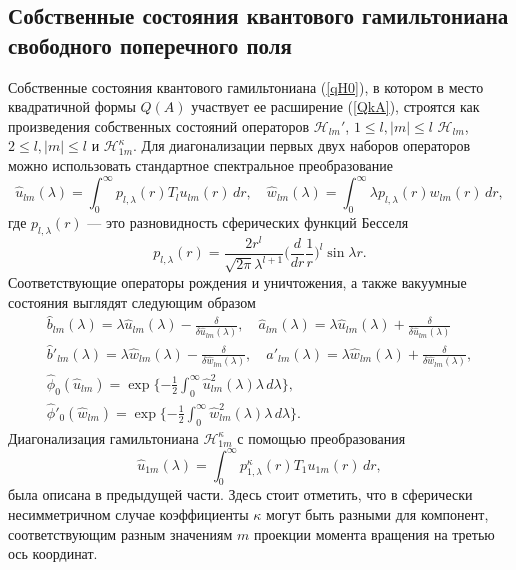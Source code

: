 \documentclass[12pt]{article}
\newcommand{\HH}{\mathscr{H}}
\begin{document}
\subsection{Собственные состояния квантового гамильтониана свободного
поперечного поля}
    Собственные состояния квантового гамильтониана
(\ref{qH0}),
    в котором в место квадратичной формы
$ Q(A) $
    участвует ее расширение
(\ref{QkA}),
    строятся как произведения собственных состояний операторов
$ \HH_{lm}' $, 
$ 1\leq l, |m| \leq l $
$ \HH_{lm} $,
$ 2\leq l, |m| \leq l $
    и
$ \HH_{1m}^{\kappa} $.
    Для диагонализации первых двух наборов операторов можно использовать
    стандартное спектральное преобразование
\begin{equation*}
    \hat{u}_{lm}(\lambda)
	= \int_{0}^{\infty} p_{l,\lambda}(r) T_{l} u_{lm}(r)\,dr ,
    \quad \hat{w}_{lm}(\lambda)
	= \int_{0}^{\infty} \lambda p_{l,\lambda}(r) w_{lm}(r)\,dr ,
\end{equation*}
    где 
$ p_{l,\lambda}(r) $ --- это разновидность сферических функций Бесселя
\begin{equation*}
    p_{l,\lambda}(r) = \frac{2r^{l}}{\sqrt{2\pi}\lambda^{l+1}}
	\bigl(\frac{d}{dr}\frac{1}{r}\bigr)^{l} \sin \lambda r .
\end{equation*}
    Соответствующие операторы рождения и уничтожения, а также
    вакуумные состояния выглядят следующим образом
\begin{gather*}
    \hat{b}_{lm}(\lambda) = \lambda \hat{u}_{lm}(\lambda)
	- \frac{\delta}{\delta \hat{u}_{lm}(\lambda)} ,\quad
    \hat{a}_{lm}(\lambda) = \lambda \hat{u}_{lm}(\lambda) 
	+ \frac{\delta}{\delta \hat{u}_{lm}(\lambda)} \\
    \hat{b}'_{lm}(\lambda) = \lambda \hat{w}_{lm}(\lambda)
	- \frac{\delta}{\delta \hat{w}_{lm}(\lambda)} ,\quad
    \hat{a}'_{lm}(\lambda) = \lambda \hat{w}_{lm}(\lambda) 
	+ \frac{\delta}{\delta \hat{w}_{lm}(\lambda)} ,\\
    \hat{\phi}_{0}(\hat{u}_{lm}) = \exp\{-\frac{1}{2}
	\int_{0}^{\infty} \hat{u}_{lm}^{2}(\lambda) \lambda \,d\lambda \} ,\\
    \hat{\phi}'_{0}(\hat{w}_{lm}) = \exp\{-\frac{1}{2}
	\int_{0}^{\infty} \hat{w}_{lm}^{2}(\lambda) \lambda \,d\lambda \} .
\end{gather*}
    Диагонализация гамильтониана
$ \HH_{1m}^{\kappa} $
    с помощью преобразования
\begin{equation*}
    \hat{u}_{1m}(\lambda) = \int_{0}^{\infty} p_{1,\lambda}^{\kappa}(r)
	T_{1} u_{1m}(r)\,dr, 
\end{equation*}
    была описана в предыдущей части. Здесь стоит отметить, что в сферически
    несимметричном случае коэффициенты
$ \kappa $
    могут быть разными для компонент, соответствующим разным значениям
$ m $
    проекции момента вращения на третью ось координат.
\end{document}
